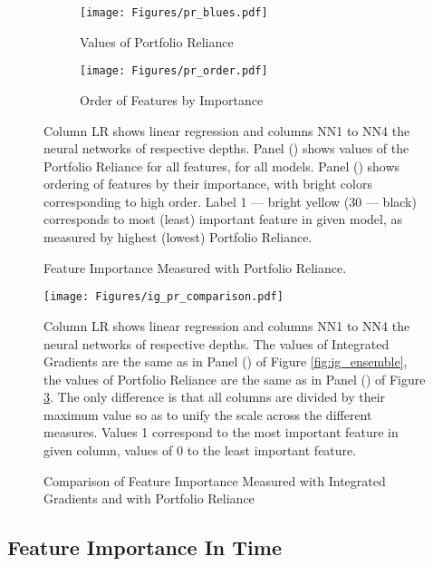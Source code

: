 	
	\begin{figure}	
		\centering		
		\begin{subfigure}[t]{\textwidth}
			\texttt{[image: Figures/pr\_blues.pdf]}
			\caption{Values of Portfolio Reliance}
			\label{fig:pr_blues}
		\end{subfigure}
		
		\begin{subfigure}[t]{\textwidth}
			\centering
			\texttt{[image: Figures/pr\_order.pdf]}
			\caption{Order of Features by Importance}
			\label{fig:pr_order}
		\end{subfigure}
		\caption{Feature Importance Measured with Portfolio Reliance.}
		\medskip
		\small
		Column LR shows linear regression and columns NN1 to NN4 the neural networks of respective depths. Panel () shows values of the Portfolio Reliance for all features, for all models.  Panel () shows ordering of features by their importance, with bright colors corresponding to high order. Label 1 --- bright yellow (30 --- black) corresponds to most (least) important feature in given model, as measured by highest (lowest) Portfolio Reliance. 
		\label{fig:pr_ensemble}
	\end{figure}

	\begin{figure}
		\centering
		\texttt{[image: Figures/ig\_pr\_comparison.pdf]}
		\caption{Comparison of Feature Importance Measured with Integrated Gradients and with Portfolio Reliance}
		\label{fig:ig_pr_comparison}
		\medskip
		\small 
		Column LR shows linear regression and columns NN1 to NN4 the neural networks of respective depths. The values of Integrated Gradients are the same as in Panel () of Figure \ref{fig:ig_ensemble}, the values of Portfolio Reliance are the same as in Panel () of Figure \ref{fig:pr_ensemble}. The only difference is that all columns are divided by their maximum value so as to unify the scale across the different measures. Values 1 correspond to the most important feature in given column, values of 0 to the least important feature. 
	\end{figure}


\subsection{Feature Importance In Time}

